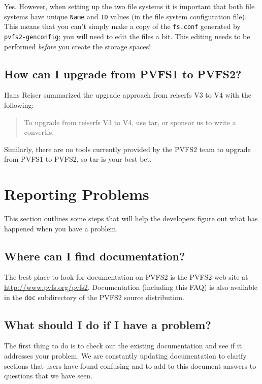 \documentclass[11pt,letterpaper]{article}
\begin{document}
Yes.  However, when setting up the two file systems it is important that both
file systems have unique \texttt{Name} and \texttt{ID} values (in the
file system configuration file).  This means that you can't simply make a copy
of the \texttt{fs.conf} generated by \texttt{pvfs2-genconfig}; you will need
to edit the files a bit.  This editing needs to be performed \emph{before} you
create the storage spaces!

\subsection{How can I upgrade from PVFS1 to PVFS2?}

Hans Reiser summarized the upgrade approach from reiserfs V3 to V4 with the following:
\begin{quote}
To upgrade from reiserfs V3 to V4, use tar, or sponsor us to write a convertfs.
\end{quote}
Similarly, there are no tools currently provided by the PVFS2 team to
upgrade from PVFS1 to PVFS2, so tar is your best bet.

%
%
\section{Reporting Problems}

This section outlines some steps that will help the developers figure out what
has happened when you have a problem.

\subsection{Where can I find documentation?}

The best place to look for documentation on PVFS2 is the PVFS2 web site at
\url{http://www.pvfs.org/pvfs2}.  Documentation (including this FAQ) is also
available in the \texttt{doc} subdirectory of the PVFS2 source distribution.

\subsection{What should I do if I have a problem?}

The first thing to do is to check out the existing documentation and see if it
addresses your problem.  We are constantly updating documentation to clarify
sections that users have found confusing and to add to this document answers
to questions that we have seen.
\end{document}
